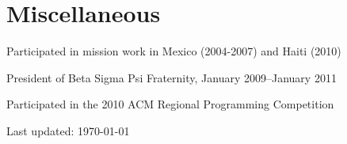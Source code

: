 \documentclass[10pt,letterpaper]{article}
\renewenvironment{itemize}{
  \begin{list}{}{
    \setlength{\leftmargin}{1.5em}
    \setlength{\itemsep}{0.25em}
    \setlength{\parskip}{0pt}
    \setlength{\parsep}{0.25em}
  }
}{
  \end{list}
}
\begin{document}


\section*{Miscellaneous}

\begin{itemize}
    \item Participated in mission work in Mexico (2004-2007) and Haiti (2010)
    \item President of Beta Sigma Psi Fraternity, January 2009--January 2011
    \item Participated in the 2010 ACM Regional Programming Competition
\end{itemize}

\bigskip

\begin{center}
  \begin{small}
    Last updated: \today
  \end{small}
\end{center}
\end{document}
